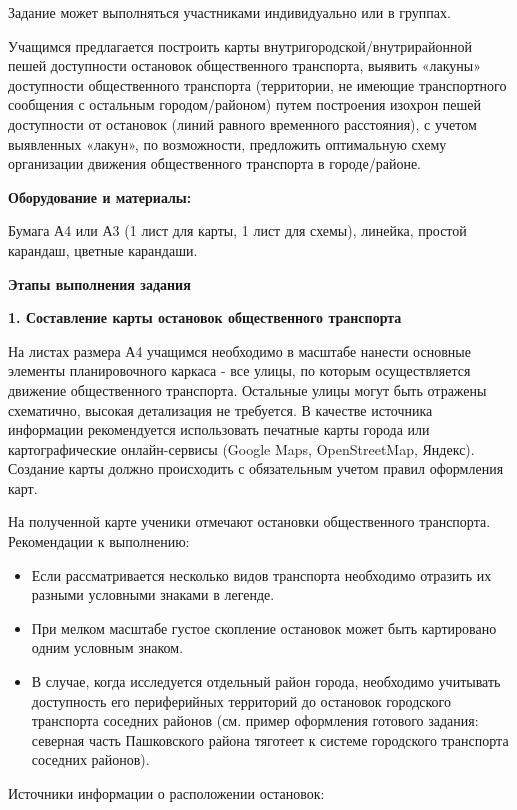 \documentclass[
  11pt,
]{book}
\begin{document}
Задание может выполняться участниками индивидуально или в группах.

Учащимся предлагается построить карты внутригородской/внутрирайонной пешей доступности остановок общественного транспорта, выявить «лакуны» доступности общественного транспорта (территории, не имеющие транспортного сообщения с остальным городом/районом) путем построения изохрон пешей доступности от остановок
(линий равного временного расстояния), с учетом выявленных «лакун», по возможности, предложить оптимальную схему организации движения общественного транспорта в городе/районе.

\textbf{Оборудование и материалы:}

Бумага А4 или А3 (1 лист для карты, 1 лист для схемы), линейка, простой карандаш, цветные карандаши.

\textbf{Этапы выполнения задания}

\textbf{1. Составление карты остановок общественного транспорта}

На листах размера А4 учащимся необходимо в масштабе нанести основные элементы планировочного каркаса
- все улицы, по которым осуществляется движение общественного транспорта. Остальные улицы могут быть отражены схематично, высокая детализация не требуется. В качестве источника информации рекомендуется использовать печатные карты города или картографические онлайн-сервисы (Google Maps, OpenStreetMap, Яндекс). Создание карты должно происходить с обязательным учетом правил оформления карт.

На полученной карте ученики отмечают остановки общественного транспорта. Рекомендации к выполнению:

\begin{itemize}
\item
  Если рассматривается несколько видов транспорта необходимо отразить их разными условными знаками в легенде.
\item
  При мелком масштабе густое скопление остановок может быть картировано одним условным знаком.
\item
  В случае, когда исследуется отдельный район города, необходимо учитывать доступность его периферийных территорий до остановок городского транспорта соседних районов (см. пример оформления готового задания:
  северная часть Пашковского района тяготеет к системе городского транспорта соседних районов).
\end{itemize}

Источники информации о расположении остановок:
\end{document}
